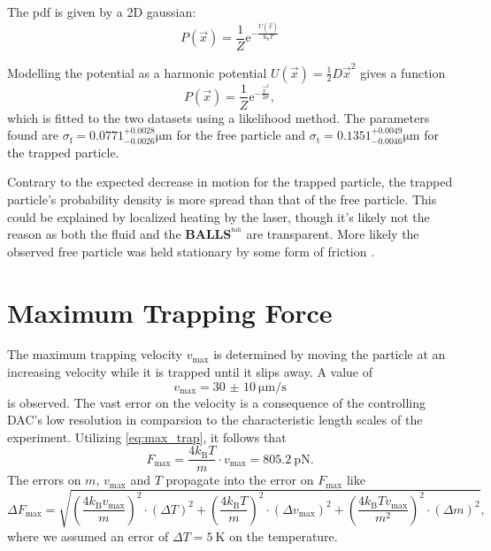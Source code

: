 The pdf is given by a 2D gaussian:
\begin{equation*}
	P(\vec{x}) = \frac{1}{Z} \text{e}^{-\frac{U(\vec{x})}{\text{k}_\text{b} T}}
\end{equation*}

Modelling the potential as a harmonic potential $U(\vec{x}) = \frac{1}{2} D \vec{x}^2$ gives a function
\begin{equation}
	P(\vec{x}) = \frac{1}{Z} \text{e}^{-\frac{\vec{x}^2}{2 \sigma}},
\end{equation}
which is fitted to the two datasets using a likelihood method.
The parameters found are $\sigma_\text{f} = \num{0.0771}^{+0.0028}_{-0.0026}\si{\um}$ for the free particle and $\sigma_\text{t} = \num{0.1351}^{+0.0049}_{-0.0046}\si{\um}$ for the trapped particle.

Contrary to the expected decrease in motion for the trapped particle, the trapped particle's probability density is more spread than that of the free particle.
This could be explained by localized heating by the laser, though it's likely not the reason as both the fluid and the \textbf{BALLS}$^{^\text{hah}}$ are transparent.
More likely the observed free particle was held stationary by some form of friction .

\section{Maximum Trapping Force}
The maximum trapping velocity $v_\text{max}$ is determined by moving the particle at an increasing velocity while it is trapped until it slips away.
A value of
\begin{equation*}
	v_\text{max} = \SI{30(10)}{\micro\meter\per\second}
\end{equation*}
is observed.
The vast error on the velocity is a consequence of the controlling DAC's low resolution in comparsion to the characteristic length scales of the experiment.
Utilizing \autoref{eq:max_trap}, it follows that
\begin{equation*}
	F_\text{max} = \frac{4k_\text{B}T}{m}\cdot v_\text{max} = \SI{805.2}{\pico\newton}.	%
\end{equation*}
The errors on $m$, $v_\text{max}$ and $T$ propagate into the error on $F_\text{max}$ like
\begin{equation*}
	\Delta F_\text{max} = \sqrt{\left(\frac{4k_\text{B}v_\text{max}}{m}\right)^2\cdot\left(\Delta T\right)^2 + \left(\frac{4k_\text{B}T}{m}\right)^2\cdot\left(\Delta v_\text{max}\right)^2 + \left(\frac{4k_\text{B}Tv_\text{max}}{m^2}\right)^2\cdot\left(\Delta m\right)^2},
\end{equation*}
where we assumed an error of $\Delta T = \SI{5}{\kelvin}$ on the temperature.


